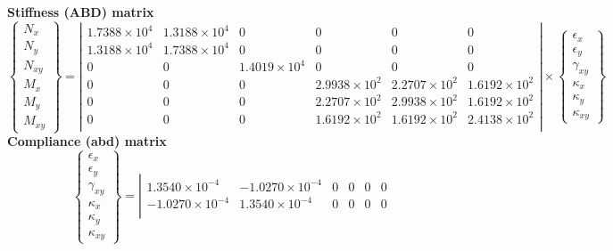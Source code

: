 \begin{table}[!htbp]
  \vbox{
    \vbox{\small\textbf{Stiffness (ABD) matrix}\\[-5mm]
      \tiny\[\left\{\begin{array}{c}
          N_x\\ N_y\\ N_{xy}\\ M_x\\ M_y\\ M_{xy}
        \end{array}\right\} = 
      \left|\begin{array}{cccccc}
           1.7388\times 10^{4} &  1.3188\times 10^{4} & 0 & 0 & 0 & 0\\
           1.3188\times 10^{4} &  1.7388\times 10^{4} & 0 & 0 & 0 & 0\\
          0 & 0 &  1.4019\times 10^{4} & 0 & 0 & 0\\
          0 & 0 & 0 &  2.9938\times 10^{2} &  2.2707\times 10^{2} &  1.6192\times 10^{2}\\
          0 & 0 & 0 &  2.2707\times 10^{2} &  2.9938\times 10^{2} &  1.6192\times 10^{2}\\
          0 & 0 & 0 &  1.6192\times 10^{2} &  1.6192\times 10^{2} &  2.4138\times 10^{2}\\
          \end{array}\right| \times
        \left\{\begin{array}{c}
            \epsilon_x\\[3pt] \epsilon_y\\[3pt] \gamma_{xy}\\[3pt]
            \kappa_x\\[3pt] \kappa_y\\[3pt] \kappa_{xy}
          \end{array}\right\}\]
    }
    \vbox{\small\textbf{Compliance (abd) matrix}\\[-5mm]
      \tiny\[\left\{\begin{array}{c}
            \epsilon_x\\[3pt] \epsilon_y\\[3pt] \gamma_{xy}\\[3pt]
            \kappa_x\\[3pt] \kappa_y\\[3pt] \kappa_{xy}
          \end{array}\right\} = \left|\begin{array}{cccccc}
           1.3540\times 10^{-4} & -1.0270\times 10^{-4} & 0 & 0 & 0 & 0\\
          -1.0270\times 10^{-4} &  1.3540\times 10^{-4} & 0 & 0 & 0 & 0\\

\end{array}\]}}
\end{table}
